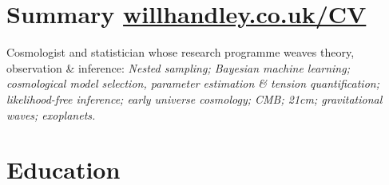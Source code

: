 \documentclass[11pt,a4paper,sans]{moderncv}
\begin{document}
\makecvtitle{}
\vspace{-10pt}
\section{Summary \hfill\href{www.willhandley.co.uk/CV}{willhandley.co.uk/CV}}
Cosmologist and statistician whose research programme weaves theory, observation \& inference:
\textit{\noindent
Nested sampling; Bayesian machine learning; cosmological model selection, parameter estimation \& tension quantification; likelihood-free inference; early universe cosmology; CMB; 21cm; gravitational waves; exoplanets.
}

\section{Education}
\end{document}
